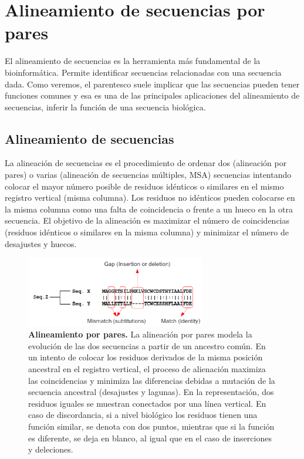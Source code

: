 \chapter{Alineamiento de secuencias por pares}
El alineamiento de secuencias es la herramienta más fundamental de la bioinformática. Permite identificar secuencias relacionadas con una secuencia dada. Como veremos, el parentesco suele implicar que las secuencias pueden tener funciones comunes y esa es una de las principales aplicaciones del alineamiento de secuencias, inferir la función de una secuencia biológica.

\section{Alineamiento de secuencias}
La alineación de secuencias es el procedimiento de ordenar dos (alineación por pares) o varias (alineación de secuencias múltiples, MSA) secuencias intentando colocar el mayor número posible de residuos idénticos o similares en el mismo registro vertical (misma columna). Los residuos no idénticos pueden colocarse en la misma columna como una falta de coincidencia o frente a un hueco en la otra secuencia. El objetivo de la alineación es maximizar el número de coincidencias (residuos idénticos o similares en la misma columna) y minimizar el número de desajustes y huecos.

\begin{figure}[htbp]
\centering
\includegraphics[width = 0.7\textwidth]{figs/pairwise-alignment.png}
\caption{\textbf{Alineamiento por pares.} La alineación por pares modela la evolución de las dos secuencias a partir de un ancestro común. En un intento de colocar los residuos derivados de la misma posición ancestral en el registro vertical, el proceso de alienación maximiza las coincidencias y minimiza las diferencias debidas a mutación de la secuencia ancestral (desajustes y lagunas). En la representación, dos residuos iguales se muestran conectados por una línea vertical. En caso de discordancia, si a nivel biológico los residuos tienen una función similar, se denota con dos puntos, mientras que si la función es diferente, se deja en blanco, al igual que en el caso de inserciones y deleciones.}
\end{figure}


